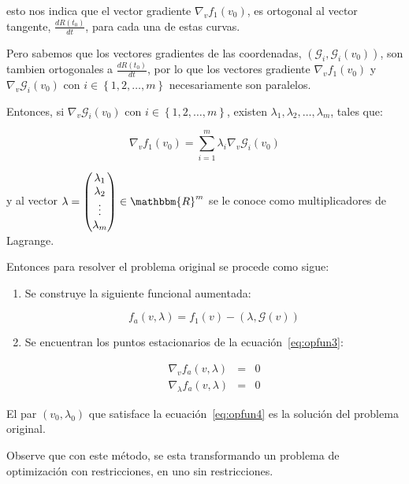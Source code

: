             esto nos indica que el vector gradiente $\nabla_v f_1(v_0)$, es ortogonal al vector tangente, $\frac{d R(t_0)}{dt}$, para cada una de estas curvas.

            Pero sabemos que los vectores gradientes de las coordenadas, $\left( \mathscr{G}_i, \mathscr{G}_i(v_0) \right)$, son tambien ortogonales a $\frac{d R(t_0)}{dt}$, por lo que los vectores gradiente $\nabla_v f_1(v_0)$ y $\nabla_v \mathscr{G}_i(v_0)$ con $i \in \left\{ 1, 2, \dots, m \right\}$ necesariamente son paralelos.

            Entonces, si $\nabla_v \mathscr{G}_i(v_0)$ con $i \in \left\{ 1, 2, \dots, m \right\}$, existen $\lambda_1, \lambda_2, \dots, \lambda_m$, tales que:

            \begin{equation}
                \nabla_v f_1(v_0) = \sum_{i=1}^m \lambda_i \nabla_v \mathscr{G}_i(v_0)
            \end{equation}

            y al vector $\lambda = \begin{pmatrix} \lambda_1 \\ \lambda_2 \\ \vdots \\ \lambda_m \end{pmatrix} \in \mathbbm{R}^m$ se le conoce como multiplicadores de Lagrange.

            Entonces para resolver el problema original se procede como sigue:

            \begin{enumerate}
                \item Se construye la siguiente funcional aumentada:

                \begin{equation}\label{eq:opfun3}
                    f_a(v, \lambda) = f_1(v) - \left( \lambda, \mathscr{G}(v) \right)
                \end{equation}

                \item Se encuentran los puntos estacionarios de la ecuación~\ref{eq:opfun3}:

                \begin{eqnarray}\label{eq:opfun4}
                    \nabla_v f_a(v, \lambda) & = & 0 \nonumber \\
                    \nabla_\lambda f_a(v, \lambda) & = & 0
                \end{eqnarray}
            \end{enumerate}

            El par $(v_0, \lambda_0)$ que satisface la ecuación~\ref{eq:opfun4} es la solución del problema original.

            Observe que con este método, se esta transformando un problema de optimización con restricciones, en uno sin restricciones.
